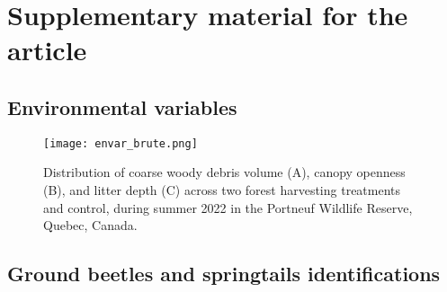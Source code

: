 \chapter{Supplementary material for the article}     %
\label{chap:supp}                   %

\pagebreak
\section{Environmental variables}

\begin{figure}[h]
   \centering
   \texttt{[image: envar\_brute.png]}
   \caption[\hl{Distribution of coarse woody debris volume, canopy openness, and litter depth across two forest harvesting treatments and control.}]
   {Distribution of coarse woody debris volume (A), canopy openness (B), and litter depth (C) across two forest harvesting treatments and control, 
   during summer 2022 in the Portneuf Wildlife Reserve, Quebec, Canada.}
   \label{fig:envar_raw}
 \end{figure}

\clearpage


\section{Ground beetles and springtails identifications}

